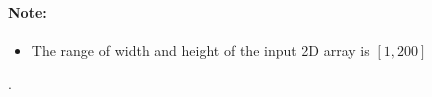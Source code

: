 \paragraph{Note:}

\begin{itemize}
\item  The range of width and height of the input 2D array is $[1,200]$
\end{itemize}.
